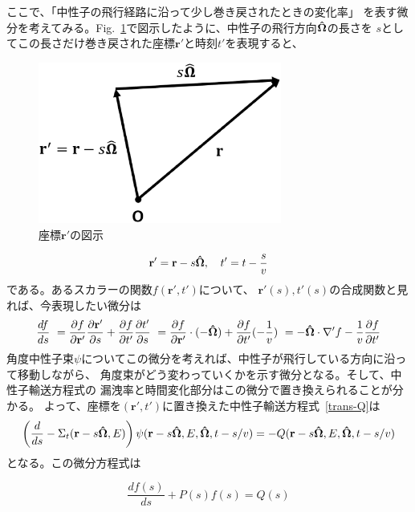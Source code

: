ここで、「中性子の飛行経路に沿って少し巻き戻されたときの変化率」
を表す微分を考えてみる。Fig.~\ref{path-s}で図示したように、中性子の飛行方向$\mathbf{\hat{\Omega}}$の長さを
$s$としてこの長さだけ巻き戻された座標$\mathbf{r}'$と時刻$t'$を表現すると、
\begin{figure}[htbp]
  \begin{center}
  \includegraphics[width=80mm]{figure/path-s.eps}
  \caption{座標$\mathbf{r}'$の図示}\label{path-s}
  \end{center}
\end{figure}
\begin{equation}
  \mathbf{r}' = \mathbf{r} - s\mathbf{\hat{\Omega}}, \quad t' = t - \frac{s}{v}
\end{equation}
である。あるスカラーの関数$f(\mathbf{r}', t')$について、
$\mathbf{r}'(s), t'(s)$の合成関数と見れば、今表現したい微分は
\begin{align}
  \frac{df}{ds}
  \ = \frac{\partial f}{\partial \mathbf{r}'} \frac{\partial \mathbf{r}'}{\partial s} + \frac{\partial f}{\partial t'} \frac{\partial t'}{\partial s}
  \ = \frac{\partial f}{\partial \mathbf{r}'} \cdot (-\mathbf{\hat{\Omega}}) + \frac{\partial f}{\partial t'} (-\frac{1}{v})
  \ = -\mathbf{\hat{\Omega}} \cdot \nabla' f - \frac{1}{v} \frac{\partial f}{\partial t'}
\end{align}
角度中性子束$\psi$についてこの微分を考えれば、中性子が飛行している方向に沿って移動しながら、
角度束がどう変わっていくかを示す微分となる。そして、中性子輸送方程式の
漏洩率と時間変化部分はこの微分で置き換えられることが分かる。
よって、座標を$(\mathbf{r}', t')$に置き換えた中性子輸送方程式~\eqref{trans-Q}は
\begin{equation}
  \left( \frac{d}{ds} - \Sigma_t(\mathbf{r} - s\mathbf{\hat{\Omega}}, E) \right) \psi(\mathbf{r} - s\mathbf{\hat{\Omega}}, E, \mathbf{\hat{\Omega}}, t - s/v) = 
  -Q(\mathbf{r} - s\mathbf{\hat{\Omega}}, E, \mathbf{\hat{\Omega}}, t - s/v) \label{trans-s}
\end{equation}
となる。この微分方程式は

\begin{equation}
  \frac{df(s)}{ds} + P(s)f(s) = Q(s)
\end{equation}


